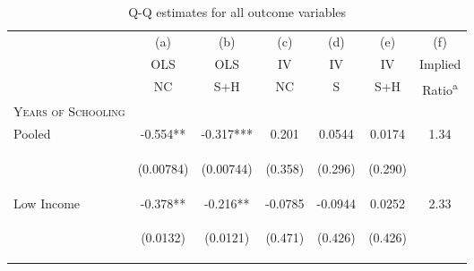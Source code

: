 \documentclass{article}[11pt,subeqn]
\begin{document}
\begin{spacing}{1.5}
\begin{table}														
\caption{Q-Q estimates for all outcome variables}														
\vspace{-3mm}														
\label{tab:fertilityALL}														
\begin{center}														
\begin{tabular}{lcccccc} \toprule														
& (a) & (b) & (c) & (d) & (e) & (f)\\														
& OLS & OLS & IV & IV & IV & Implied \\														
& NC & S+H & NC & S & S+H & Ratio\textsuperscript{a} \\														
\midrule														
\textsc{Years of Schooling} & & & & & &\\														
Pooled &		-0.554**	&	-0.317***	&	0.201	&	0.0544	&	0.0174	&	1.34		\\
\vspace{4pt} &	\begin{footnotesize}	(0.00784)	\end{footnotesize} & \begin{footnotesize}	(0.00744)	\end{footnotesize} & \begin{footnotesize}	(0.358)	\end{footnotesize} & \begin{footnotesize}	(0.296)	\end{footnotesize} & \begin{footnotesize}	(0.290)	\end{footnotesize} & \begin{footnotesize}		\end{footnotesize}	\\
Low Income &		-0.378**	&	-0.216**	&	-0.0785	&	-0.0944	&	0.0252	&	2.33		\\
\vspace{4pt} &	\begin{footnotesize}	(0.0132)	\end{footnotesize} & \begin{footnotesize}	(0.0121)	\end{footnotesize} & \begin{footnotesize}	(0.471)	\end{footnotesize} & \begin{footnotesize}	(0.426)	\end{footnotesize} & \begin{footnotesize}	(0.426)	\end{footnotesize} & \begin{footnotesize}		\end{footnotesize}	\\

\end{tabular}
\end{center}
\end{table}
\end{spacing}
\end{document}
